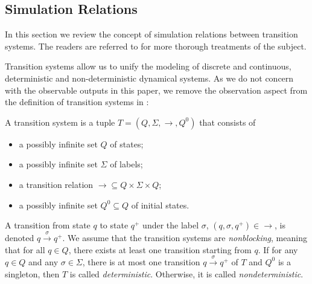 \subsection{Simulation Relations} %
\label{sec:abstraction:simulation}

In this section we review the concept of simulation relations between
transition systems. The readers are referred to \cite{aluretal00dah,girardetal07amd} for more thorough treatments of the subject.

 Transition systems allow us to unify the modeling of
discrete and continuous, deterministic and non-deterministic dynamical
systems.
As we do not concern with the observable outputs %
in this paper, we remove the observation aspect from the definition of transition
systems in {\cite{girardetal07amd}}:
      \vspace{-5pt}
\begin{definition}
  \label{thm:transition-systems-def}
  A transition system is a tuple $T = (Q, \Sigma, \rightarrow, Q^0)$ that
  consists of
        \vspace{-5pt}
  \begin{itemize}
  \item a possibly infinite set $Q$ of states;
      \vspace{-5pt}
  \item a possibly infinite set $\Sigma$ of labels;
      \vspace{-5pt}
  \item a transition relation $\rightarrow \subseteq Q \times \Sigma \times
    Q$;
          \vspace{-5pt}
  \item a possibly infinite set $Q^0 \subseteq Q$ of initial states.
  \end{itemize}
\end{definition}

A transition from state $q$ to state $q^+$ under the label $\sigma$, {\ie}
$(q, \sigma, q^+) \in \rightarrow$, is denoted $q \xrightarrow{\sigma} q^+$.
We assume that the transition systems are {\emph{nonblocking}}, meaning that
for all $q \in Q$, there exists at least one transition starting from $q$. If
for any $q \in Q$ and any $\sigma \in \Sigma$, there is at most one transition
$q \xrightarrow{\sigma} q^+$ of $T$ and $Q^0$ is a singleton, then $T$ is
called {\emph{deterministic}}. Otherwise, it is called
{\emph{nondeterministic}}.

